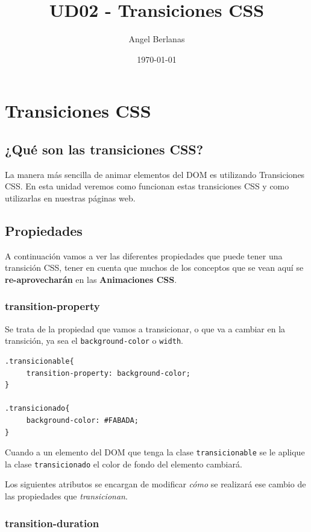 \documentclass[11pt]{article}
\author{Angel Berlanas}
\date{\today}
\title{UD02 - Transiciones CSS}
\begin{document}
\maketitle
\tableofcontents


\section{Transiciones CSS}
\label{sec-1}

\subsection{¿Qué son las transiciones CSS?}
\label{sec-1-1}

La manera más sencilla de animar elementos del DOM es utilizando Transiciones CSS. 
En esta unidad veremos como funcionan estas transiciones CSS y como utilizarlas en 
nuestras páginas web.

\subsection{Propiedades}
\label{sec-1-2}

A continuación vamos a ver las diferentes propiedades que puede tener una transición 
CSS, tener en cuenta que muchos de los conceptos que se vean aquí se \textbf{re-aprovecharán} en 
las \textbf{Animaciones CSS}.

\subsubsection{transition-property}
\label{sec-1-2-1}


Se trata de la propiedad que vamos a transicionar, o que va a cambiar en la
transición, ya sea el \verb~background-color~ o \verb~width~. 

\begin{verbatim}
.transicionable{
     transition-property: background-color;
}

.transicionado{
     background-color: #FABADA;
}
\end{verbatim}

Cuando a un elemento del DOM que tenga la clase \verb~transicionable~ se le aplique
la clase \verb~transicionado~ el color de fondo del elemento cambiará.

Los siguientes atributos se encargan de modificar \emph{cómo} se realizará ese cambio
de las propiedades que \emph{transicionan}.

\subsubsection{transition-duration}
\label{sec-1-2-2}
\end{document}
